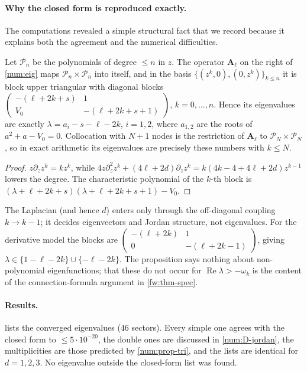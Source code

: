 \paragraph{Why the closed form is reproduced exactly.}
The computations revealed a simple structural fact that we record because it
explains both the agreement and the numerical difficulties.
\begin{proposition}\label{num:prop-tri}
Let $\mathcal P_n$ be the polynomials of degree $\le n$ in $z$. The operator
$\mathbf A_\ell$ on the right of \eqref{num:eig} maps $\mathcal P_n\times\mathcal P_n$
into itself, and in the basis $\{(z^k,0),(0,z^k)\}_{k\le n}$ it is block upper
triangular with diagonal blocks
$\begin{pmatrix}-(\ell+2k+s)&1\\ V_0&-(\ell+2k+s+1)\end{pmatrix}$, $k=0,\dots,n$.
Hence its eigenvalues are exactly $\lambda=a_i-s-\ell-2k$, $i=1,2$, where
$a_{1,2}$ are the roots of $a^2+a-V_0=0$. Collocation with $N+1$ nodes is the
restriction of $\mathbf A_\ell$ to $\mathcal P_N\times\mathcal P_N$, so in exact
arithmetic its eigenvalues are precisely these numbers with $k\le N$.
\end{proposition}
\begin{proof}
$z\partial_z z^k=kz^k$, while $4z\partial_z^2z^k+(4\ell+2d)\partial_zz^k=k(4k-4+4\ell+2d)z^{k-1}$
lowers the degree. The characteristic polynomial of the $k$-th block is
$(\lambda+\ell+2k+s)(\lambda+\ell+2k+s+1)-V_0$.
\end{proof}
The Laplacian (and hence $d$) enters only through the off-diagonal coupling
$k\to k-1$; it decides eigenvectors and Jordan structure, not eigenvalues.
For the derivative model the blocks are
$\begin{pmatrix}-(\ell+2k)&1\\0&-(\ell+2k-1)\end{pmatrix}$, giving
$\lambda\in\{1-\ell-2k\}\cup\{-\ell-2k\}$. The proposition says nothing about
non-polynomial eigenfunctions; that these do not occur for
$\operatorname{Re}\lambda>-\omega_k$ is the content of the connection-formula
argument in \cref{fw:thm-spec}.

\paragraph{Results.}  lists the converged eigenvalues
(46 sectors). Every simple one agrees with the closed form to
$\le5\cdot10^{-20}$, the double ones are discussed in \ref{num:D-jordan}, the
multiplicities are those predicted by \cref{num:prop-tri}, and the lists are
identical for $d=1,2,3$. No eigenvalue outside the closed-form list was found.

